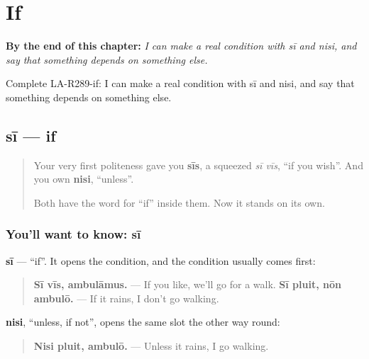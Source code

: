 
\chapter{If}
\label{ch:la-if}

\begin{chapteropening}
\textbf{By the end of this chapter:} \emph{I can make a real condition with sī and nisi, and say that something depends on something else.}

Complete LA-R289-if: I can make a real condition with sī and nisi, and say that something depends on something else.
\end{chapteropening}

\section[sī, nisi]{sī — if}

\label{lesson:LA-C289-si}



\begin{quote}
Your very first politeness gave you \textbf{sīs}, a squeezed \emph{sī vīs}, \textquotedblleft{}if you wish\textquotedblright{}. And you own \textbf{nisi}, \textquotedblleft{}unless\textquotedblright{}.

Both have the word for \textquotedblleft{}if\textquotedblright{} inside them. Now it stands on its own.
\end{quote}

\subsection*{You'll want to know: sī}
\textbf{sī} — \textquotedblleft{}if\textquotedblright{}. It opens the condition, and the condition usually comes first:

\begin{quote}
\textbf{Sī vīs, ambulāmus.} — If you like, we'll go for a walk. \textbf{Sī pluit, nōn ambulō.} — If it rains, I don't go walking.
\end{quote}

\textbf{nisi}, \textquotedblleft{}unless, if not\textquotedblright{}, opens the same slot the other way round:

\begin{quote}
\textbf{Nisi pluit, ambulō.} — Unless it rains, I go walking.
\end{quote}

